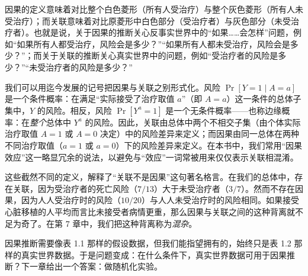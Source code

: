 因果的定义意味着对比整个白色菱形（所有人受治疗）与整个灰色菱形（所有人未受治疗）；而关联意味着对比原菱形中白色部分（受治疗者）与灰色部分（未受治疗者）。也就是说，关于因果的推断关心反事实世界中的“如果……会怎样”问题，例如“如果所有人都受治疗，风险会是多少？”“如果所有人都未受治疗，风险会是多少？”；而关于关联的推断关心真实世界中的问题，例如“受治疗者的风险是多少？”“未受治疗者的风险是多少？”

我们可以用迄今发展的记号把因果与关联之别形式化。风险 $\Pr[Y=1\mid A=a]$ 是一个条件概率：在满足“实际接受了治疗取值 $a$”（即 $A=a$）这一条件的总体子集中，$Y$ 的风险。相反，风险 $\Pr[Y^{a}=1]$ 是一个无条件概率——也称边缘概率：在\emph{整个}总体中 $Y^{a}$ 的风险。因此，关联由总体中两个不相交子集（由个体实际治疗取值 $A=1$ 或 $A=0$ 决定）中的风险差异来定义；而因果由同一总体在两种不同治疗取值（$a=1$ 或 $a=0$）下的风险差异来定义。在本书中，我们常用“因果效应”这一略显冗余的说法，以避免与“效应”一词常被用来仅仅表示关联相混淆。

这些截然不同的定义，解释了“关联不是因果”这句著名格言。在我们的总体中，存在关联，因为受治疗者的死亡风险（$7/13$）大于未受治疗者（$3/7$）。然而不存在因果，因为人人受治疗时的风险（$10/20$）与人人未受治疗时的风险相同。如果接受心脏移植的人平均而言比未接受者病情更重，那么因果与关联之间的这种背离就不足为奇了。在第 7 章中，我们把这种背离称为\emph{混杂}。

因果推断需要像表 1.1 那样的假设数据，但我们能指望拥有的，始终只是表 1.2 那样的真实世界数据。于是问题变成：在什么条件下，真实世界数据可用于因果推断？下一章给出一个答案：做随机化实验。

